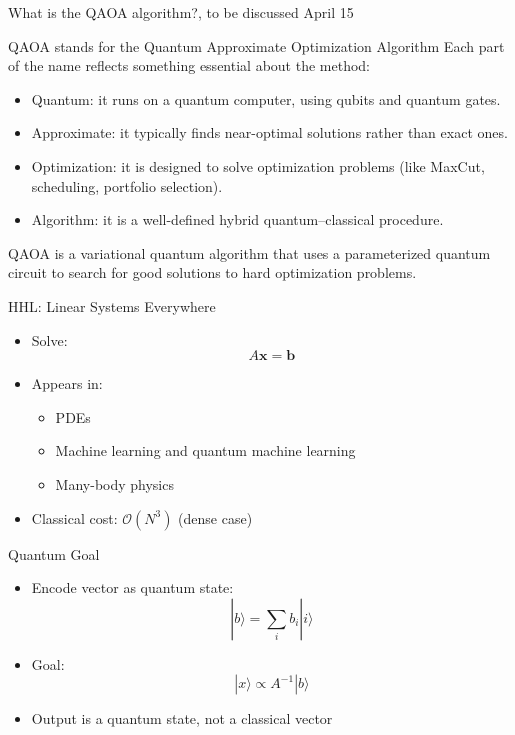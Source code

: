 \documentclass{beamer}
\begin{document}
\begin{frame}{What is the QAOA algorithm?, to be discussed April 15}
\begin{block}{QAOA stands for the Quantum Approximate Optimization Algorithm}
Each part of the name reflects something essential about the method:
\begin{itemize}
\item Quantum: it runs on a quantum computer, using qubits and quantum gates.
\item Approximate: it typically finds near-optimal solutions rather than exact ones.
\item Optimization: it is designed to solve optimization problems (like MaxCut, scheduling, portfolio selection).
\item Algorithm: it is a well-defined hybrid quantum–classical procedure.
\end{itemize}
\end{block}

QAOA is a variational quantum algorithm that uses a parameterized quantum circuit to search for good solutions to hard optimization problems.
\end{frame}


\begin{frame}{HHL: Linear Systems Everywhere}
\begin{itemize}
\item Solve:
\[
A \mathbf{x} = \mathbf{b}
\]
\item Appears in:
\begin{itemize}
\item PDEs
\item Machine learning and quantum machine learning
\item Many-body physics
\end{itemize}
\item Classical cost: $\mathcal{O}(N^3)$ (dense case)
\end{itemize}
\end{frame}


\begin{frame}{Quantum Goal}
\begin{itemize}
\item Encode vector as quantum state:
\[
|b\rangle = \sum_i b_i |i\rangle
\]
\item Goal:
\[
|x\rangle \propto A^{-1}|b\rangle
\]
\item Output is a quantum state, not a classical vector
\end{itemize}
\end{frame}
\end{document}
